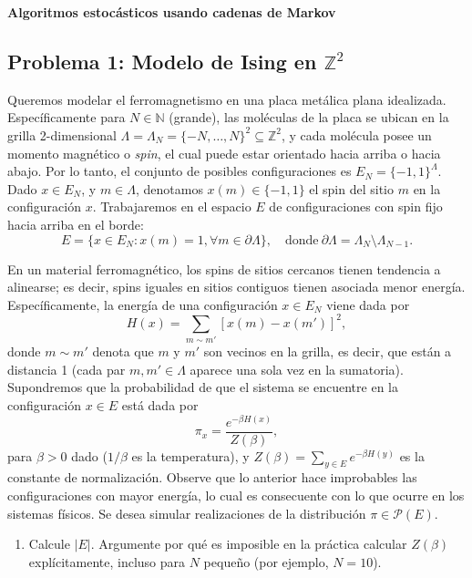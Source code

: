 \vspace{0.3cm}
\begin{center}
{\huge \textbf{Algoritmos estocásticos usando cadenas de Markov}}
\end{center}

\subsection*{Problema 1: Modelo de Ising en $\mathbb{Z}^2$}

Queremos modelar el ferromagnetismo en una placa metálica plana idealizada. Específicamente para $N\in\mathbb{N}$ (grande), las moléculas de la placa se ubican en la grilla 2-dimensional $\Lambda = \Lambda_N = \{-N,\ldots,N\}^2 \subseteq \mathbb{Z}^2$, y cada molécula posee un momento magnético o \emph{spin}, el cual puede estar orientado hacia arriba o hacia abajo. Por lo tanto, el conjunto de posibles configuraciones es $E_N = \{-1,1\}^\Lambda$. Dado $x\in E_N$, y $m\in \Lambda$, denotamos $x(m) \in \{-1,1\}$ el spin del sitio $m$ en la configuración $x$. Trabajaremos en el espacio $E$ de configuraciones con spin fijo hacia arriba en el borde:
\[
E = \{ x\in E_N : x(m)=1, \forall m\in \partial \Lambda \},
\quad \text{donde} ~
\partial \Lambda = \Lambda_N \setminus \Lambda_{N-1}.
\]

En un material ferromagnético, los spins de sitios cercanos tienen tendencia a alinearse; es decir, spins iguales en sitios contiguos tienen asociada menor energía. Específicamente, la energía de una configuración $x\in E_N$ viene dada por
\[
H(x) = \sum_{m \sim m'} [ x(m) - x(m')]^2,
\]
donde $m\sim m'$ denota que $m$ y $m'$ son vecinos en la grilla, es decir, que están a distancia 1 (cada par $m,m'\in \Lambda$ aparece una sola vez en la sumatoria). Supondremos que la probabilidad de que el sistema se encuentre en la configuración $x\in E$ está dada por
\[
\pi_x = \frac{e^{-\beta H(x)}}{Z(\beta)},
\]
para $\beta>0$ dado ($1/\beta$ es la temperatura), y $Z(\beta) = \sum_{y\in E} e^{-\beta H(y)}$ es la constante de normalización. Observe que lo anterior hace improbables las configuraciones con mayor energía, lo cual es consecuente con lo que ocurre en los sistemas físicos. Se desea simular realizaciones de la distribución $\pi \in \mathcal{P}(E)$.

\begin{enumerate}
	\item Calcule $|E|$. Argumente por qué es imposible en la práctica calcular $Z(\beta)$ explícitamente, incluso para $N$ pequeño (por ejemplo, $N=10$).
\end{enumerate}


